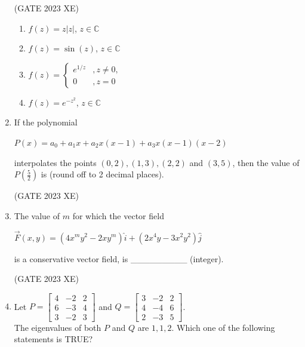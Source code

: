\documentclass[journal,12pt,onecolumn]{IEEEtran}
\newcommand{\myvec}[1]{\begin{bmatrix}#1\end{bmatrix}}
\begin{document}
\begin{enumerate}
\hfill{(GATE 2023 XE)}

\begin{multicols}{2}

\begin{enumerate}

\item $f(z) = z |z|$, $z \in \mathbb{C}$

\item $f(z) = \sin(z)$, $z \in \mathbb{C}$

\item $f(z)=
         \begin{cases}
       e^{1/z} & , z\neq 0,\\
         0 & , z=0
        \end{cases}$

\item $f(z) = e^{-z^2}$, $z \in \mathbb{C}$

\end{enumerate}

\end{multicols}

\item If the polynomial

$P(x) = a_0 + a_1 x + a_2 x(x-1) + a_3 x(x-1)(x-2)$

interpolates the points $(0,2), (1,3), (2,2)$ and $(3,5)$, then the value of $P(\frac{5}{2})$ is \underline{\hspace{3cm}} (round off to 2 decimal places).

\hfill{(GATE 2023 XE)}

\newpage

\item The value of $m$ for which the vector field

$\vec{F}(x,y) = (4x^m y^2 - 2 x y^m) \hat{i} + (2 x^4 y - 3 x^2 y^2) \hat{j}$

is a conservative vector field, is \_\_\_\_\_\_\_\_\_ (integer).

\hfill{(GATE 2023 XE)}

\item Let  $P = \myvec{4 & -2 & 2\\ 6 & -3 & 4\\ 3 & -2 & 3}$ and $Q = \myvec{3 & -2 & 2\\ 4 & -4 & 6\\ 2 & -3 & 5}$.\\

The eigenvalues of both $P$ and $Q$ are $1, 1, 2$. Which one of the following
statements is TRUE?


\end{enumerate}
\end{document}
